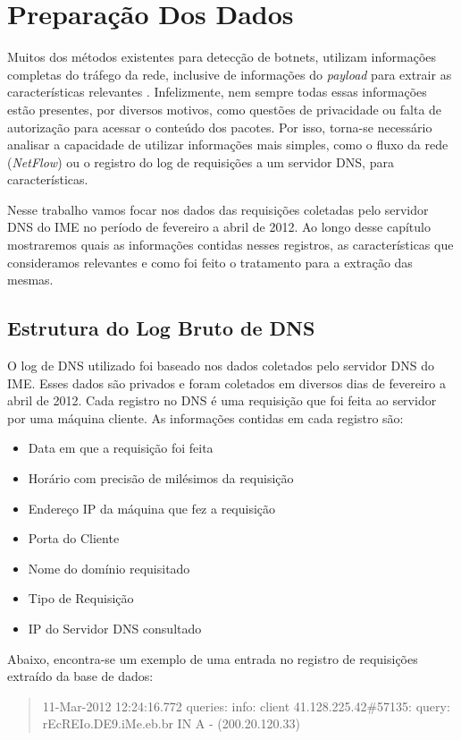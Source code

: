 \chapter{Preparação Dos Dados}
Muitos dos métodos existentes para detecção de botnets, utilizam informações completas do tráfego da rede, inclusive de informações do \textit{payload} para extrair as características relevantes \citep{krmicek2011inspecting}. Infelizmente, nem sempre todas essas informações estão presentes, por diversos motivos, como questões de privacidade ou falta de autorização para acessar o conteúdo dos pacotes. Por isso, torna-se necessário analisar a capacidade de utilizar informações mais simples, como o fluxo da rede (\textit{NetFlow}) ou o registro do log de requisições a um servidor DNS, para características.

Nesse trabalho vamos focar nos dados das requisições coletadas pelo servidor DNS do IME no período de fevereiro a abril de 2012. Ao longo desse capítulo mostraremos quais as informações contidas nesses registros, as características que consideramos relevantes e como foi feito o tratamento para a extração das mesmas.

\section{Estrutura do Log Bruto de DNS }
O log de DNS utilizado foi baseado nos dados coletados pelo servidor DNS do IME. Esses dados são privados e foram coletados em diversos dias de fevereiro a abril de 2012. Cada registro no DNS é uma requisição que foi feita ao servidor por uma máquina cliente. As informações contidas em cada registro são:

\begin{itemize}
\item Data em que a requisição foi feita
\item Horário com precisão de milésimos da requisição
\item Endereço IP da máquina que fez a requisição
\item Porta do Cliente
\item Nome do domínio requisitado
\item Tipo de Requisição
\item IP do Servidor DNS consultado
\end{itemize}

Abaixo, encontra-se um exemplo de uma entrada no registro de requisições extraído da base de dados: 

\begin{quote}
11-Mar-2012 12:24:16.772 queries: info: client 41.128.225.42\#57135: query: rEcREIo.DE9.iMe.eb.br IN A - (200.20.120.33)
\end{quote}

